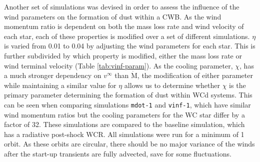 \documentclass[fleqn,usenatbib]{mnras}
\begin{document}
Another set of simulations was devised in order to assess the influence of the wind parameters on the formation of dust within a CWB.
As the wind momentum ratio is dependent on both the mass loss rate and wind velocity of each star, each of these properties is modified over a set of different simulations.
$\eta$ is varied from 0.01 to 0.04 by adjusting the wind parameters for each star.
This is further subdivided by which property is modified, either the mass loss rate or wind terminal velocity (Table \ref{tab:vinf-param}).
As the cooling parameter, $\chi$, has a much stronger dependency on $v^\infty$ than $\dot{\text{M}}$, the modification of either parameter while maintaining a similar value for $\eta$ allows us to determine whether $\chi$ is the primary parameter determining the formation of dust within WCd systems.
This can be seen when comparing simulations \texttt{mdot-1} and \texttt{vinf-1}, which have similar wind momentum ratios but the cooling parameters for the WC star differ by a factor of 32.
These simulations are compared to the baseline simulation, which has a radiative post-shock WCR.
All simulations were run for a minimum of 1 orbit.
As these orbits are circular, there should be no major variance of the winds after the start-up transients are fully advected, save for some fluctuations.
\end{document}
